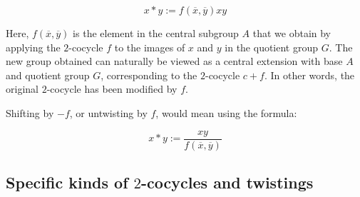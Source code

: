 \documentclass[10pt]{amsart}
\begin{document}
$$x * y := f(\overline{x},\overline{y})xy$$

Here, $f(\overline{x},\overline{y})$ is the element in the central
subgroup $A$ that we obtain by applying the $2$-cocycle $f$ to the
images of $x$ and $y$ in the quotient group $G$. The new group
obtained can naturally be viewed as a central extension with base $A$
and quotient group $G$, corresponding to the $2$-cocycle $c + f$. In
other words, the original $2$-cocycle has been modified by $f$.

Shifting by $-f$, or untwisting by $f$, would mean using the formula:

$$x * y := \frac{xy}{f(\overline{x},\overline{y})}$$


\subsection{Specific kinds of $2$-cocycles and twistings}
\end{document}
